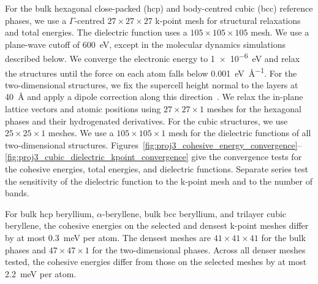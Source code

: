 For the bulk hexagonal close-packed (hcp) and body-centred cubic (bcc) reference phases, we use a $\Gamma$-centred $27 \times 27 \times 27$ k-point mesh for structural relaxations and total energies.
The dielectric function uses a $105 \times 105 \times 105$ mesh.
We use a plane-wave cutoff of \qty{600}{\electronvolt}, except in the molecular dynamics simulations described below.
We converge the electronic energy to \qty{1e-6}{\electronvolt} and relax the structures until the force on each atom falls below \qty{0.001}{\electronvolt\per\angstrom}.
For the two-dimensional structures, we fix the supercell height normal to the layers at \qty{40}{\angstrom} and apply a dipole correction along this direction~\cite{neugebauer1992adsorbate}.
We relax the in-plane lattice vectors and atomic positions using $27 \times 27 \times 1$ meshes for the hexagonal phases and their hydrogenated derivatives.
For the cubic structures, we use $25 \times 25 \times 1$ meshes.
We use a $105 \times 105 \times 1$ mesh for the dielectric functions of all two-dimensional structures.
Figures~\ref{fig:proj3_cohesive_energy_convergence}--\ref{fig:proj3_cubic_dielectric_kpoint_convergence} give the convergence tests for the cohesive energies, total energies, and dielectric functions.
Separate series test the sensitivity of the dielectric function to the k-point mesh and to the number of bands.

For bulk hcp beryllium, $\alpha$-beryllene, bulk bcc beryllium, and trilayer cubic beryllene, the cohesive energies on the selected and densest k-point meshes differ by at most \qty{0.3}{\milli\electronvolt} per atom.
The densest meshes are $41 \times 41 \times 41$ for the bulk phases and $47 \times 47 \times 1$ for the two-dimensional phases.
Across all denser meshes tested, the cohesive energies differ from those on the selected meshes by at most \qty{2.2}{\milli\electronvolt} per atom.

